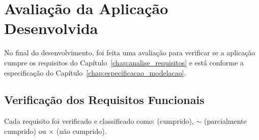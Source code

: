 \section{Avaliação da Aplicação Desenvolvida}

No final do desenvolvimento, foi feita uma avaliação para verificar se a aplicação cumpre os requisitos do Capítulo~\ref{chap:analise_requisitos} e está conforme a especificação do Capítulo~\ref{chap:especificacao_modelacao}.

\subsection{Verificação dos Requisitos Funcionais}

Cada requisito foi verificado e classificado como: {\large\checkmark} (cumprido), {\large$\sim$} (parcialmente cumprido) ou {\large$\times$} (não cumprido).

